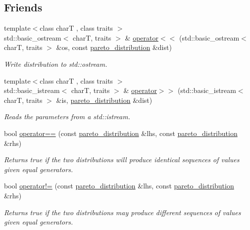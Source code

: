 \subsection*{Friends}
\begin{DoxyCompactItemize}
\item 
\mbox{\label{classpareto__distribution_a3edbe39cc0f6942c0b3852fac6d416d9}} 
{\footnotesize template$<$class charT , class traits $>$ }\\std\+::basic\+\_\+ostream$<$ charT, traits $>$ \& \mbox{\hyperlink{classpareto__distribution_a3edbe39cc0f6942c0b3852fac6d416d9}{operator$<$$<$}} (std\+::basic\+\_\+ostream$<$ charT, traits $>$ \&os, const \mbox{\hyperlink{classpareto__distribution}{pareto\+\_\+distribution}} \&dist)
\begin{DoxyCompactList}\small\item\em Write distribution to std\+::ostream. \end{DoxyCompactList}\item 
{\footnotesize template$<$class charT , class traits $>$ }\\std\+::basic\+\_\+istream$<$ charT, traits $>$ \& \mbox{\hyperlink{classpareto__distribution_a827211558343a83cda447b5ab8cce83a}{operator$>$$>$}} (std\+::basic\+\_\+istream$<$ charT, traits $>$ \&is, \mbox{\hyperlink{classpareto__distribution}{pareto\+\_\+distribution}} \&dist)
\begin{DoxyCompactList}\small\item\em Reads the parameters from a std\+::istream. \end{DoxyCompactList}\item 
\mbox{\label{classpareto__distribution_a7a67a2ffe5fc96ec9d485f5b33c6d1b6}} 
bool \mbox{\hyperlink{classpareto__distribution_a7a67a2ffe5fc96ec9d485f5b33c6d1b6}{operator==}} (const \mbox{\hyperlink{classpareto__distribution}{pareto\+\_\+distribution}} \&lhs, const \mbox{\hyperlink{classpareto__distribution}{pareto\+\_\+distribution}} \&rhs)
\begin{DoxyCompactList}\small\item\em Returns true if the two distributions will produce identical sequences of values given equal generators. \end{DoxyCompactList}\item 
\mbox{\label{classpareto__distribution_a77e9e309508a372c4bf25a0338513cfc}} 
bool \mbox{\hyperlink{classpareto__distribution_a77e9e309508a372c4bf25a0338513cfc}{operator!=}} (const \mbox{\hyperlink{classpareto__distribution}{pareto\+\_\+distribution}} \&lhs, const \mbox{\hyperlink{classpareto__distribution}{pareto\+\_\+distribution}} \&rhs)
\begin{DoxyCompactList}\small\item\em Returns true if the two distributions may produce different sequences of values given equal generators. \end{DoxyCompactList}\end{DoxyCompactItemize}


